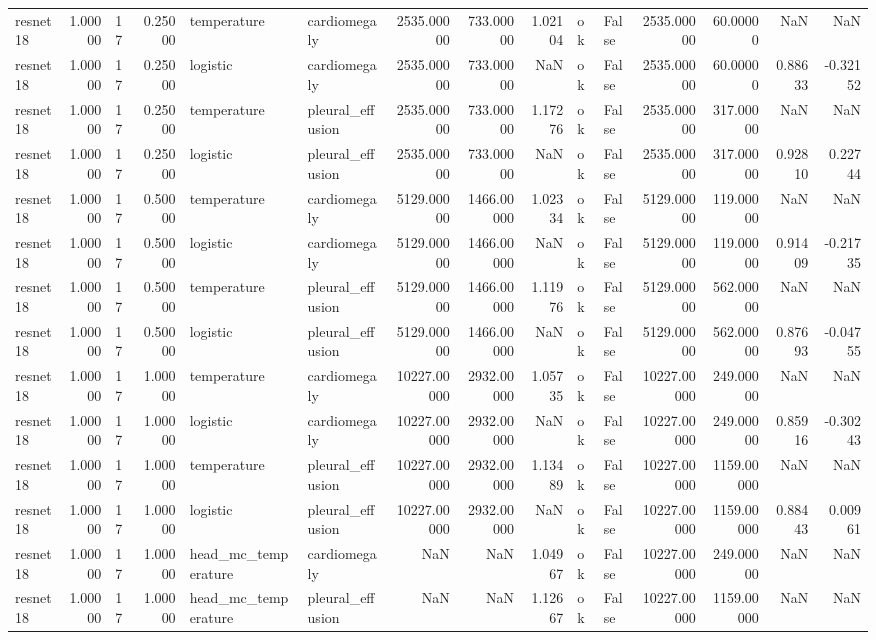 \begin{tabular}{lrlrllrrrllrrrr}
resnet18 & 1.00000 & 17 & 0.25000 & temperature & cardiomegaly & 2535.00000 & 733.00000 & 1.02104 & ok & False & 2535.00000 & 60.00000 & NaN & NaN \\
resnet18 & 1.00000 & 17 & 0.25000 & logistic & cardiomegaly & 2535.00000 & 733.00000 & NaN & ok & False & 2535.00000 & 60.00000 & 0.88633 & -0.32152 \\
resnet18 & 1.00000 & 17 & 0.25000 & temperature & pleural\_effusion & 2535.00000 & 733.00000 & 1.17276 & ok & False & 2535.00000 & 317.00000 & NaN & NaN \\
resnet18 & 1.00000 & 17 & 0.25000 & logistic & pleural\_effusion & 2535.00000 & 733.00000 & NaN & ok & False & 2535.00000 & 317.00000 & 0.92810 & 0.22744 \\
resnet18 & 1.00000 & 17 & 0.50000 & temperature & cardiomegaly & 5129.00000 & 1466.00000 & 1.02334 & ok & False & 5129.00000 & 119.00000 & NaN & NaN \\
resnet18 & 1.00000 & 17 & 0.50000 & logistic & cardiomegaly & 5129.00000 & 1466.00000 & NaN & ok & False & 5129.00000 & 119.00000 & 0.91409 & -0.21735 \\
resnet18 & 1.00000 & 17 & 0.50000 & temperature & pleural\_effusion & 5129.00000 & 1466.00000 & 1.11976 & ok & False & 5129.00000 & 562.00000 & NaN & NaN \\
resnet18 & 1.00000 & 17 & 0.50000 & logistic & pleural\_effusion & 5129.00000 & 1466.00000 & NaN & ok & False & 5129.00000 & 562.00000 & 0.87693 & -0.04755 \\
resnet18 & 1.00000 & 17 & 1.00000 & temperature & cardiomegaly & 10227.00000 & 2932.00000 & 1.05735 & ok & False & 10227.00000 & 249.00000 & NaN & NaN \\
resnet18 & 1.00000 & 17 & 1.00000 & logistic & cardiomegaly & 10227.00000 & 2932.00000 & NaN & ok & False & 10227.00000 & 249.00000 & 0.85916 & -0.30243 \\
resnet18 & 1.00000 & 17 & 1.00000 & temperature & pleural\_effusion & 10227.00000 & 2932.00000 & 1.13489 & ok & False & 10227.00000 & 1159.00000 & NaN & NaN \\
resnet18 & 1.00000 & 17 & 1.00000 & logistic & pleural\_effusion & 10227.00000 & 2932.00000 & NaN & ok & False & 10227.00000 & 1159.00000 & 0.88443 & 0.00961 \\
resnet18 & 1.00000 & 17 & 1.00000 & head\_mc\_temperature & cardiomegaly & NaN & NaN & 1.04967 & ok & False & 10227.00000 & 249.00000 & NaN & NaN \\
resnet18 & 1.00000 & 17 & 1.00000 & head\_mc\_temperature & pleural\_effusion & NaN & NaN & 1.12667 & ok & False & 10227.00000 & 1159.00000 & NaN & NaN \\

\end{tabular}

